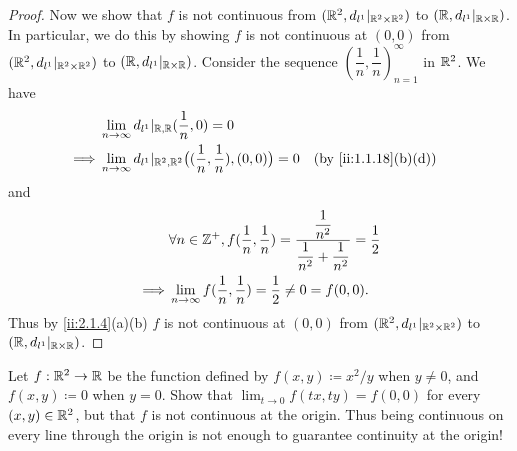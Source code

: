 \begin{proof}
  Now we show that \(f\) is not continuous from \((\mathbb{R}^2, d_{l^1}|_{\mathbb{R}^2 \times \mathbb{R}^2})\) to \((\mathbb{R}, d_{l^1}|_{\mathbb{R} \times \mathbb{R}})\).
  In particular, we do this by showing \(f\) is not continuous at \((0, 0)\) from \((\mathbb{R}^2, d_{l^1}|_{\mathbb{R}^2 \times \mathbb{R}^2})\) to \((\mathbb{R}, d_{l^1}|_{\mathbb{R} \times \mathbb{R}})\).
  Consider the sequence \((\dfrac{1}{n}, \dfrac{1}{n})_{n = 1}^\infty\) in \(\mathbb{R}^2\).
  We have
  \begin{align*}
             & \lim_{n \to \infty} d_{l^1}|_{\R, \R}(\dfrac{1}{n}, 0) = 0                                                        \\
    \implies & \lim_{n \to \infty} d_{l^1}|_{\R^2, \R^2}\big((\dfrac{1}{n}, \dfrac{1}{n}), (0, 0)\big) = 0 &  & \by{ii:1.1.18}[b,d]
  \end{align*}
  and
  \begin{align*}
             & \forall n \in \mathbb{Z}^+, f(\dfrac{1}{n}, \dfrac{1}{n}) = \dfrac{\dfrac{1}{n^2}}{\dfrac{1}{n^2} + \dfrac{1}{n^2}} = \dfrac{1}{2} \\
    \implies & \lim_{n \to \infty} f(\dfrac{1}{n}, \dfrac{1}{n}) = \dfrac{1}{2} \neq 0 = f(0, 0).
  \end{align*}
  Thus by \cref{ii:2.1.4}(a)(b) \(f\) is not continuous at \((0, 0)\) from \((\mathbb{R}^2, d_{l^1}|_{\mathbb{R}^2 \times \mathbb{R}^2})\) to \((\mathbb{R}, d_{l^1}|_{\mathbb{R} \times \mathbb{R}})\).
\end{proof}

\begin{ex}\label{ii:ex:2.2.12}
  Let \(f: \mathbb{R}^2 \to \mathbb{R}\) be the function defined by \(f(x, y) \coloneqq x^2 / y\) when \(y \neq 0\), and \(f(x, y) \coloneqq 0\) when \(y = 0\).
  Show that \(\lim_{t \to 0} f(tx, ty) = f(0, 0)\) for every \((x, y) \in \mathbb{R}^2\), but that \(f\) is not continuous at the origin.
  Thus being continuous on every line through the origin is not enough to guarantee continuity at the origin!
\end{ex}

